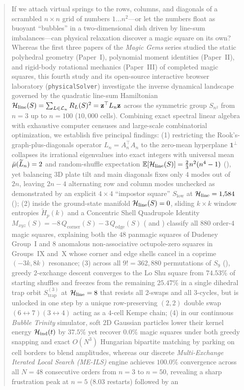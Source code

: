 \begin{abstract}
If we attach virtual springs to the rows, columns, and diagonals of a scrambled $n\times n$ grid of numbers $1\dots n^2$---or let the numbers float as buoyant ``bubbles'' in a two-dimensional dish driven by line-sum imbalances---can physical relaxation discover a magic square on its own? Whereas the first three papers of the \emph{Magic Gems} series studied the static polyhedral geometry (Paper~I), polynomial moment identities (Paper~II), and rigid-body rotational mechanics (Paper~III) of completed magic squares, this fourth study and its open-source interactive browser laboratory (\texttt{physicalSolver}) investigate the inverse dynamical landscape governed by the quadratic line-sum Hamiltonian $\Hline(S) = \sum_{L\in\mathcal{L}_n} R_L(S)^2 = \mathbf{z}^\top L_n \mathbf{z}$ across the symmetric group $S_{n^2}$ from $n = 3$ up to $n = 100$ ($10{,}000$ cells). Combining exact spectral linear algebra with exhaustive computer censuses and large-scale combinatorial optimization, we establish five principal findings: (1) restricting the Rook's-graph-plus-diagonals operator $L_n = A_n^\top A_n$ to the zero-mean hyperplane $\mathbf{1}^\perp$ collapses its irrational eigenvalues into exact integers with universal mean $\bar{\mu}(\Ltilde_n) = 2$ and random-shuffle expectation $\mathbb{E}[\Hline(S)] = \frac{2}{3}n^2(n^4-1)$ (), yet balancing $3\mathrm{D}$ plate tilt and main diagonals fixes only $4$ modes out of $2n$, leaving $2n-4$ alternating row and column modes unchecked as demonstrated by an explicit $4\times 4$ ``impostor square'' $S_{\mathrm{low}}$ at $\Hline = 1{,}584$ (); (2) inside the ground-state manifold $\Hline(S) = 0$, sliding $k\times k$ window entropies $\widetilde{H}_p(k)$ and a Concentric Shell Quadrupole Identity $M_{xyz}(S) = -8\,Q_{\mathrm{corner}}(S) - 3\,Q_{\mathrm{edge}}(S)$ ( and ) classify all $880$ order-$4$ magic squares, explaining both the $48$ panmagic squares of Dudeney Group~I and $8$ anomalous non-associative octupole-zero squares in Groups~IX and~X whose corner and edge shells cancel in a coprime $(-3k, 8k)$ resonance; (3) across all $9! = 362{,}880$ permutations of $S_9$ (), greedy $2$-exchange descent converges to the Lo Shu square from $74.53\%$ of starting shuffles and freezes from the remaining $25.47\%$ in a single dihedral trap orbit $S_{\mathrm{trap}}^{(3)}$ at $\Hline = 8$ that resists all $2$-swaps and all $3$-cycles, but is unlocked in one step by a unique row-preserving $(2,2)$ double swap $(6\leftrightarrow 7)(3\leftrightarrow 4)$ acting as a $4$-cell Kempe chain; (4) in our continuous \emph{Bubble Trinity} simulator, soft $2\mathrm{D}$ Gaussian particles lower their kernel energy $\Hind(t)$ by $37.5\%$ yet recover $0.0\%$ magic squares under both greedy snapping and exact $O(N^3)$ Hungarian bipartite matching by parking on cell borders to blend amplitudes, whereas our discrete \emph{Multi-Exchange Iterated Local Search (ME-ILS)} engine achieves $100.0\%$ convergence across all $N = 48$ consecutive orders from $n = 3$ to $n = 50$, revealing a sharp frustration peak at $n = 5$ ($8.03$ restarts) followed by an 
\end{abstract}
